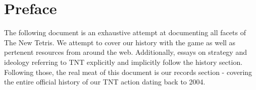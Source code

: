 \chapter{Preface}
The following document is an exhaustive attempt at documenting all facets of The New Tetris. We attempt to cover our history with the game as well as pertenent resources from around the web. Additionally, essays on strategy and ideology referring to TNT explicitly and implicitly follow the history section. Following those, the real meat of this document is our records section - covering the entire official history of our TNT action dating back to 2004.
